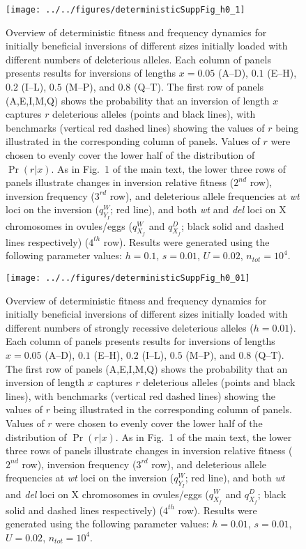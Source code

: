 \documentclass{article}
\begin{document}
\begin{appendices}
 \begin{figure}[htbp]
 \centering
 \texttt{[image: ../../figures/deterministicSuppFig\_h0\_1]}
 \caption{Overview of deterministic fitness and frequency dynamics for initially beneficial inversions of different sizes initially loaded with different numbers of deleterious alleles. Each column of panels presents results for inversions of lengths $x = 0.05$ (A--D), $0.1$ (E--H), $0.2$ (I--L), $0.5$ (M--P), and $0.8$ (Q--T). The first row of panels (A,E,I,M,Q) shows the probability that an inversion of length $x$ captures $r$ deleterious alleles (points and black lines), with benchmarks (vertical red dashed lines) showing the values of $r$ being illustrated in the corresponding column of panels. Values of $r$ were chosen to evenly cover the lower half of the distribution of $\Pr(r | x)$. As in Fig.~1 of the main text, the lower three rows of panels illustrate changes in inversion relative fitness ($2^{nd}$ row), inversion frequency ($3^{rd}$ row), and deleterious allele frequencies at {\itshape wt} loci on the inversion ($q_{Y_I}^{W}$; red line), and both {\itshape wt} and {\itshape del} loci on X chromosomes in ovules/eggs ($q_{X_f}^{W}$ and $q_{X_f}^{D}$; black solid and dashed lines respectively) ($4^{th}$ row). Results were generated using the following parameter values: $h = 0.1$, $s = 0.01$, $U = 0.02$, $n_{tot} = 10^4$.}
 \label{fig:DetermDynamics_h0.1}
 \end{figure}



 \begin{figure}[htbp]
 \centering
 \texttt{[image: ../../figures/deterministicSuppFig\_h0\_01]}
 \caption{Overview of deterministic fitness and frequency dynamics for initially beneficial inversions of different sizes initially loaded with different numbers of strongly recessive deleterious alleles ($h = 0.01$). Each column of panels presents results for inversions of lengths $x = 0.05$ (A--D), $0.1$ (E--H), $0.2$ (I--L), $0.5$ (M--P), and $0.8$ (Q--T). The first row of panels (A,E,I,M,Q) shows the probability that an inversion of length $x$ captures $r$ deleterious alleles (points and black lines), with benchmarks (vertical red dashed lines) showing the values of $r$ being illustrated in the corresponding column of panels. Values of $r$ were chosen to evenly cover the lower half of the distribution of $\Pr(r | x)$. As in Fig.~1 of the main text, the lower three rows of panels illustrate changes in inversion relative fitness ($2^{nd}$ row), inversion frequency ($3^{rd}$ row), and deleterious allele frequencies at {\itshape wt} loci on the inversion ($q_{Y_I}^{W}$; red line), and both {\itshape wt} and {\itshape del} loci on X chromosomes in ovules/eggs ($q_{X_f}^{W}$ and $q_{X_f}^{D}$; black solid and dashed lines respectively) ($4^{th}$ row). Results were generated using the following parameter values: $h = 0.01$, $s = 0.01$, $U = 0.02$, $n_{tot} = 10^4$.}
 \label{fig:DetermDynamics_h0.01}
 \end{figure}



\end{appendices}
\end{document}

